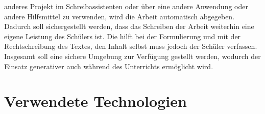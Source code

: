 \documentclass[../main.tex]{subfiles}
\begin{document}
anderes Projekt im Schreibassistenten oder über eine andere Anwendung  oder andere Hilfsmittel zu verwenden, wird die Arbeit automatisch abgegeben. Dadurch soll sichergestellt 
werden, dass das Schreiben der Arbeit weiterhin eine eigene Leistung des Schülers ist. Die  hilft bei der Formulierung und mit der Rechtschreibung des Textes, den Inhalt selbst 
muss jedoch der Schüler verfassen. Insgesamt soll eine sichere Umgebung zur Verfügung gestellt werden, wodurch der Einsatz generativer  auch während des Unterrichts ermöglicht wird.


\section{Verwendete Technologien}
\end{document}
